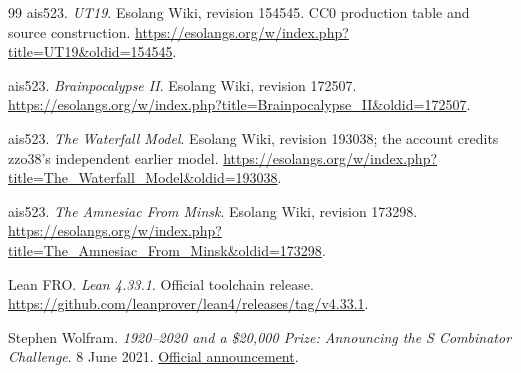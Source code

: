 \begin{thebibliography}{99}
ais523. \emph{UT19}. Esolang Wiki, revision 154545. CC0 production table
and source construction.
\url{https://esolangs.org/w/index.php?title=UT19&oldid=154545}.

ais523. \emph{Brainpocalypse II}. Esolang Wiki, revision 172507.
\url{https://esolangs.org/w/index.php?title=Brainpocalypse_II&oldid=172507}.

ais523. \emph{The Waterfall Model}. Esolang Wiki, revision 193038;
the account credits zzo38's independent earlier model.
\url{https://esolangs.org/w/index.php?title=The_Waterfall_Model&oldid=193038}.

ais523. \emph{The Amnesiac From Minsk}. Esolang Wiki, revision 173298.
\url{https://esolangs.org/w/index.php?title=The_Amnesiac_From_Minsk&oldid=173298}.

Lean FRO. \emph{Lean 4.33.1}. Official toolchain release.
\url{https://github.com/leanprover/lean4/releases/tag/v4.33.1}.

Stephen Wolfram. \emph{1920--2020 and a \$20,000 Prize: Announcing the
S Combinator Challenge}. 8 June 2021.
\href{https://writings.stephenwolfram.com/2021/06/1920-2020-and-a-20000-prize-announcing-the-s-combinator-challenge/}{Official announcement}.
\end{thebibliography}
